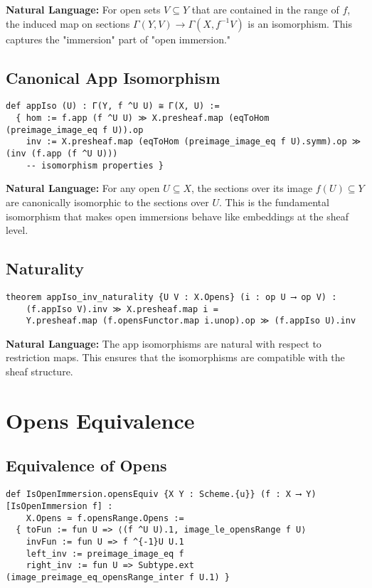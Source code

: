 \documentclass{article}
\theoremstyle{definition}
\begin{document}
\textbf{Natural Language:} For open sets $V \subseteq Y$ that are contained in the range of $f$, the induced map on sections $\Gamma(Y, V) \to \Gamma(X, f^{-1}V)$ is an isomorphism. This captures the "immersion" part of "open immersion."

\subsection{Canonical App Isomorphism}

\begin{lstlisting}
def appIso (U) : Γ(Y, f ^U U) ≅ Γ(X, U) :=
  { hom := f.app (f ^U U) ≫ X.presheaf.map (eqToHom (preimage_image_eq f U)).op
    inv := X.presheaf.map (eqToHom (preimage_image_eq f U).symm).op ≫ (inv (f.app (f ^U U)))
    -- isomorphism properties }
\end{lstlisting}

\textbf{Natural Language:} For any open $U \subseteq X$, the sections over its image $f(U) \subseteq Y$ are canonically isomorphic to the sections over $U$. This is the fundamental isomorphism that makes open immersions behave like embeddings at the sheaf level.

\subsection{Naturality}

\begin{lstlisting}
theorem appIso_inv_naturality {U V : X.Opens} (i : op U ⟶ op V) :
    (f.appIso V).inv ≫ X.presheaf.map i = 
    Y.presheaf.map (f.opensFunctor.map i.unop).op ≫ (f.appIso U).inv
\end{lstlisting}

\textbf{Natural Language:} The app isomorphisms are natural with respect to restriction maps. This ensures that the isomorphisms are compatible with the sheaf structure.

\section{Opens Equivalence}

\subsection{Equivalence of Opens}

\begin{lstlisting}
def IsOpenImmersion.opensEquiv {X Y : Scheme.{u}} (f : X ⟶ Y) [IsOpenImmersion f] :
    X.Opens ≃ f.opensRange.Opens :=
  { toFun := fun U => ⟨(f ^U U).1, image_le_opensRange f U⟩
    invFun := fun U => f ^{-1}U U.1
    left_inv := preimage_image_eq f
    right_inv := fun U => Subtype.ext (image_preimage_eq_opensRange_inter f U.1) }
\end{lstlisting}
\end{document}
